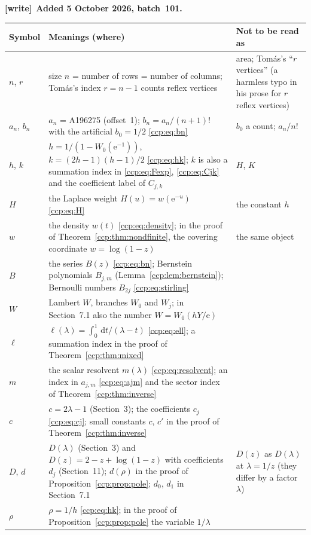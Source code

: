 \documentclass[11pt,letterpaper]{article}
\theoremstyle{remark}\newtheorem{remark}[theorem]{Remark}
\newcommand{\dd}{\,\mathrm d}
\newcommand{\ee}{\mathrm e}
\newenvironment{writenote}[1][]{\par\smallskip\begingroup\small
 \noindent\textbf{[write]}\if\relax\detokenize{#1}\relax\else~\textbf{#1.}\fi\ }%
 {\par\endgroup\smallskip}
\begin{document}
\begin{writenote}[Added 5 October 2026, batch~101]
\smallskip
\begingroup\renewcommand{\arraystretch}{1.1}
\begin{longtable}{@{}p{0.5in}p{3.85in}p{1.95in}@{}}
\toprule
Symbol & Meanings (where) & Not to be read as\\
\midrule
\endhead
$n$, $r$ & size $n$ = number of rows = number of columns; Tom\'as's index
 $r=n-1$ counts reflex vertices~\cite{tomas} & area; Tom\'as's ``$r$
 vertices'' (a harmless typo in his prose for $r$ reflex vertices)\\
$a_n$, $b_n$ & $a_n$ = A196275 (offset~1); $b_n=a_n/(n+1)!$ with the
 artificial $b_0=1/2$ \eqref{ccp:eq:bn} & $b_0$ a count; $a_n/n!$\\
$h$, $k$ & $h=1/(1-W_0(\ee^{-1}))$, $k=(2h-1)(h-1)/2$ \eqref{ccp:eq:hk};
 $k$ is also a summation index in \eqref{ccp:eq:Fexp}, \eqref{ccp:eq:Cjk}
 and the coefficient label of $C_{j,k}$ & $H$, $K$\\
$H$ & the Laplace weight $H(u)=w(\ee^{-u})$ \eqref{ccp:eq:H} & the constant
 $h$\\
$w$ & the density $w(t)$ \eqref{ccp:eq:density}; in the proof of
 Theorem~\ref{ccp:thm:nondfinite}, the covering coordinate $w=\log(1-z)$ &
 the same object\\
$B$ & the series $B(z)$ \eqref{ccp:eq:bn}; Bernstein polynomials $B_{j,m}$
 (Lemma~\ref{ccp:lem:bernstein}); Bernoulli numbers $B_{2j}$
 \eqref{ccp:eq:stirling} & \\
$W$ & Lambert $W$, branches $W_0$ and $W_j$; in Section~7.1 also the number
 $W=W_0(hY/\ee)$ & \\
$\ell$ & $\ell(\lambda)=\int_0^1\dd t/(\lambda-t)$ \eqref{ccp:eq:ell}; a
 summation index in the proof of Theorem~\ref{ccp:thm:mixed} & \\
$m$ & the scalar resolvent $m(\lambda)$ \eqref{ccp:eq:resolvent}; an index
 in $a_{j,m}$ \eqref{ccp:eq:ajm} and the sector index of
 Theorem~\ref{ccp:thm:inverse} & \\
$c$ & $c=2\lambda-1$ (Section~3); the coefficients $c_j$ \eqref{ccp:eq:cj};
 small constants $c$, $c'$ in the proof of Theorem~\ref{ccp:thm:inverse} & \\
$D$, $d$ & $D(\lambda)$ (Section~3) and $D(z)=2-z+\log(1-z)$ with
 coefficients $d_j$ (Section~11); $d(\rho)$ in the proof of
 Proposition~\ref{ccp:prop:pole}; $d_0$, $d_1$ in Section~7.1 & $D(z)$ as
 $D(\lambda)$ at $\lambda=1/z$ (they differ by a factor $\lambda$)\\
$\rho$ & $\rho=1/h$ \eqref{ccp:eq:hk}; in the proof of
 Proposition~\ref{ccp:prop:pole} the variable $1/\lambda$ & \\

\end{longtable}
\end{writenote}
\end{document}
